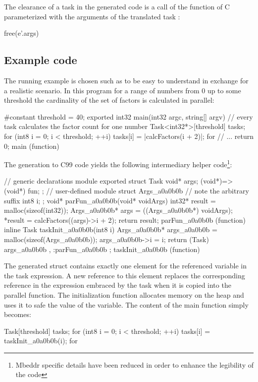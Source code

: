 The clearance of a task  in the generated code is a call of the  function of C parameterized with the arguments of the translated task :
\begin{ccode}
free(e'.args)
\end{ccode}

\subsection{Example code}
The running example is chosen such as to be easy to understand in exchange for a realistic scenario. In this program for a range of numbers from 0 up to some threshold the cardinality of the set of factors is calculated in parallel:

\begin{ccode}
#constant threshold = 40; 
exported int32 main(int32 argc, string[] argv) { 
  // every task calculates the factor count for one number
  Task<int32*>[threshold] tasks; 
  for (int8 i = 0; i < threshold; ++i) { 
    tasks[i] = |calcFactors(i + 2)|; 
  } for 
  // ...
  return 0; 
} main (function)

\end{ccode}

The generation to C99 code yields the following intermediary helper code\footnote{Mbeddr specific details have been reduced in order to enhance the legibility of the code}:
\begin{ccode}
// generic declarations module
exported struct Task {
  void* args; 
  (void*)=>(void*) fun; 
};
// user-defined module
struct Args_a0a0b0b { // note the arbitrary suffix
  int8 i;             
};
void* parFun_a0a0b0b(void* voidArgs) { 
  int32* result = malloc(sizeof(int32)); 
  Args_a0a0b0b* args = ((Args_a0a0b0b*) voidArgs); 
  *result = calcFactors((args)->i + 2); 
  return result; 
} parFun_a0a0b0b (function)             
inline Task taskInit_a0a0b0b(int8 i) { 
  Args_a0a0b0b* args_a0a0b0b = malloc(sizeof(Args_a0a0b0b)); 
  args_a0a0b0b->i = i; 
  return (Task){ args_a0a0b0b , :parFun_a0a0b0b }; 
} taskInit_a0a0b0b (function)
\end{ccode}
The generated struct contains exactly one element for the referenced variable in the task expression. A new reference to this element replaces the corresponding reference in the expression embraced by the task when it is copied into the parallel function. The initialization function allocates memory on the heap and uses it to safe the value of the variable. The content of the main function simply becomes:
\begin{ccode}
Task[threshold] tasks; 
for (int8 i = 0; i < threshold; ++i) { 
  tasks[i] = taskInit_a0a0b0b(i); 
} for
\end{ccode}

